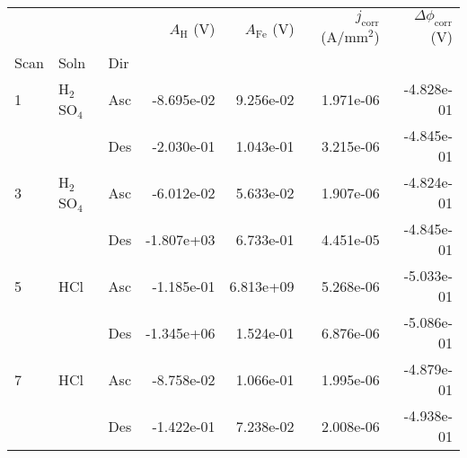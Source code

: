 \begin{tabular}{lllrrrr}
\toprule
  &     &     &  $A_{\text{H}}$ (V) &  $A_{\text{Fe}}$ (V) &  $j_{\text{corr}}$ (A/mm$^2$) &  $\Delta \phi_{\text{corr}}$ (V) \\
Scan & Soln & Dir &                     &                      &                               &                                  \\
\midrule
1 & H$_2$SO$_4$ & Asc &          -8.695e-02 &            9.256e-02 &                     1.971e-06 &                       -4.828e-01 \\
  &     & Des &          -2.030e-01 &            1.043e-01 &                     3.215e-06 &                       -4.845e-01 \\
3 & H$_2$SO$_4$ & Asc &          -6.012e-02 &            5.633e-02 &                     1.907e-06 &                       -4.824e-01 \\
  &     & Des &          -1.807e+03 &            6.733e-01 &                     4.451e-05 &                       -4.845e-01 \\
5 & HCl & Asc &          -1.185e-01 &            6.813e+09 &                     5.268e-06 &                       -5.033e-01 \\
  &     & Des &          -1.345e+06 &            1.524e-01 &                     6.876e-06 &                       -5.086e-01 \\
7 & HCl & Asc &          -8.758e-02 &            1.066e-01 &                     1.995e-06 &                       -4.879e-01 \\
  &     & Des &          -1.422e-01 &            7.238e-02 &                     2.008e-06 &                       -4.938e-01 \\
\bottomrule
\end{tabular}
